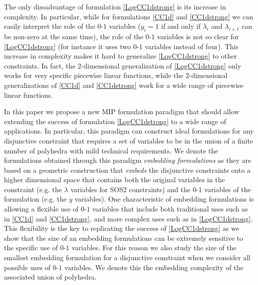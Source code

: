 \documentclass[mnsc]{informs3}
\begin{document}
The only dissadvantage of formulation \eqref{LogCC1dstrong} is its increase in complexity. In particular, while for formulations \eqref{CC1d} and  \eqref{CC1dstrong} we can easily interpret the role of the $0$-$1$ variables ($y_i=1$ if and only if $\lambda_i$ and $\lambda_{i+1}$ can be non-zero at the same time), the role of the $0$-$1$ variables is not so clear for \eqref{LogCC1dstrong} (for instance it uses two $0$-$1$ variables instead of four). This increase in complexity makes it hard to generalize \eqref{LogCC1dstrong} to other constraints. In fact, the 2-dimensional generalization of  \eqref{LogCC1dstrong} only works for very specific piecewise linear functions, while the 2-dimensional generalizations of \eqref{CC1d} and \eqref{CC1dstrong} work for a wide range of piecewise linear functions. 


In this paper we propose a new MIP formulation paradigm that should allow extending the success of formulation \eqref{LogCC1dstrong} to a wide range of applications. In particular, this paradigm can construct ideal formulations for any disjunctive constraint that requires a set of variables to be in the union of a finite number of polyhedra with mild technical requirements. We denote the formulations obtained through this paradigm \emph{embedding formulations} as they are based on a geometric construction that \emph{embeds} the disjunctive constraints onto a higher dimensional space that contains both the original variables in the constraint (e.g. the $\lambda$ variables for SOS2 constraints) and the $0$-$1$ variables of the formulation (e.g. the $y$ variables). One characteristic of embedding formulations is allowing a flexible use of $0$-$1$ variables that include both traditional uses such as in \eqref{CC1d} and  \eqref{CC1dstrong},  and more complex uses such as in \eqref{LogCC1dstrong}. This flexibility is the key to replicating the success of \eqref{LogCC1dstrong} as we show that the size of an embedding formulations can be extremely sensitive to the specific use of $0$-$1$ variables. For this reason we also study the  size of the smallest embedding formulation for a disjunctive constraint when we consider all possible uses of $0$-$1$ variables. We denote this the embedding complexity of the associated union of polyhedra. 
\end{document}
